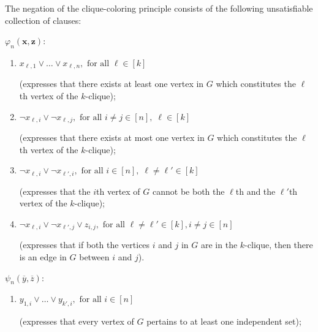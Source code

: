 \begin{definition}\label{def-clique-color}
The negation of the clique-coloring principle consists of the following
unsatisfiable collection of clauses:

\underline{$\varphi_n(\mathbf{x,z})$}:
\renewcommand{\theenumi}{\roman{enumi}}   %
\begin{enumerate}
\item $x_{\ell,1}\lor\dots\lor x_{\ell,n}, \mbox{ for all } \ell\in[k]$

(expresses that there exists at least one vertex in $G$ which constitutes
the $\ell$th vertex of the $k$-clique); \label{eq-clique-q-pigeons}%

\item $\neg x_{\ell,i}\lor \neg x_{\ell,j},  \mbox{ for all } i\ne j \in [n],\;
          \ell\in[k]$

(expresses that there exists at most one vertex in $G$ which constitutes
the $\ell$th vertex of the $k$-clique); \label{eq-clique-functional-q}%

\item $\neg x_{\ell,i}\lor \neg x_{\ell',i}, \mbox{ for all } i\in [n],\;
          \ell\ne \ell'\in[k]$

(expresses that the $i$th vertex of $G$ cannot be both the $\ell$th
and the $\ell'$th vertex of the $k$-clique);\label{eq-clique-holes-q}%

\item $\neg x_{\ell,i}\lor \neg x_{\ell',j}\lor z_{i,j}, \mbox{ for all }
\ell\ne\ell'\in[k], i\ne j\in[n]$

(expresses that if both the vertices $i$ and $j$ in $G$ are in the $k$-clique,
then there is an edge in $G$ between $i$ and $j$).
\label{eq-clique-p-and-q-vars}%
\end{enumerate}

\underline{$\psi_n(\overline{y},\overline{z})$}:

\begin{enumerate}


\item $y_{1,i}\vee \dots \vee y_{k',i}, \mbox{ for all } i\in[n]$

(expresses that every vertex of $G$ pertains to at least one independent set);
\label{eq-clique-r-pigeons}%


\end{enumerate}
\end{definition}
